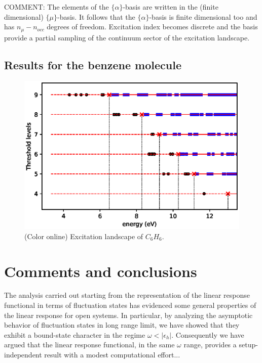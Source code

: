 \documentclass[reprint,aps,prb]{revtex4-1}
\newcommand{\eps}{\epsilon}
\begin{document}
COMMENT: The elements of the $\{\alpha\}$-basis are written in the (finite dimensional) $\{\mu\}$-basis. It follows that the $\{\alpha\}$-basis is finite dimensional too and has $n_\mu-n_{occ}$ degrees
of freedom. Excitation index becomes discrete and the basis provide a partial sampling of the continuum sector of the excitation landscape.    




\subsection{Results for the benzene molecule}

\begin{figure}[ht]
\includegraphics[scale=0.56]{c6h6_excitationLandscape.eps}
\caption{\label{c6h6_excLand}(Color online) Excitation landscape of $C_6H_6$.}
\end{figure}

\section{Comments and conclusions}

The analysis carried out starting from the representation of the linear response functional in terms of fluctuation states has evidenced some general properties of the linear response
for open systems. In particular, by analyzing the asymptotic behavior of fluctuation states in long range limit, we have showed that they exhibit a bound-state character in the regime  
$\omega<|\eps_h|$. Consequently we have argued that the linear response functional, in the same $\omega$ range, provides a setup-independent result with a modest computational effort... 
\end{document}
